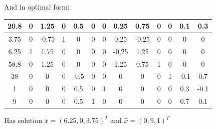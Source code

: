\documentclass[a4paper,12pt]{article}
\begin{document}
And in optimal form:
\begin{center}
\begin{tabular}{| c | c  c  c  c  c  c  c  c  c  c  c  c |}
\hline
20.8 & 0 & 1.25 & 0 & 0.5 & 0 & 0 & 0.25 & 0.75 & 0 & 0 & 0.1 & 0.3\\
\hline
3.75 & 0 & -0.75 & 1 & 0 & 0 & 0 & 0.25 & -0.25 & 0 & 0 & 0 & 0\\
6.25 & 1 & 1.75 & 0 & 0 & 0 & 0 & -0.25 & 1.25 & 0 & 0 & 0 & 0\\
58.8 & 0 & 1.25 & 0 & 0 & 0 & 0 & 1.25 & 0.75 & 1 & 0 & 0 & 0\\
38 & 0 & 0 & 0 & -0.5 & 0 & 0 & 0 & 0 & 0 & 1 & -0.1 & 0.7\\
1 & 0 & 0 & 0 & 0.5 & 0 & 1 & 0 & 0 & 0 & 0 & 0.3 & -0.1\\
9 & 0 & 0 & 0 & 0.5 & 1 & 0 & 0 & 0 & 0 & 0 & 0.7 & 0.1\\
\hline
\end{tabular}
\end{center}

Has solution \(\bar{x} = (6.25, 0, 3.75)^T\) and \(\hat{x} = (0, 9, 1)^T \) 
\end{document}
